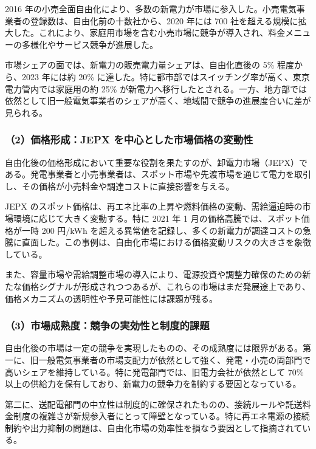 2016 年の小売全面自由化により、多数の新電力が市場に参入した。小売電気事業者の登録数は、自由化前の十数社から、2020 年には 700 社を超える規模に拡大した\parencite{METI2020RetailData}。これにより、家庭用市場を含む小売市場に競争が導入され、料金メニューの多様化やサービス競争が進展した。

市場シェアの面では、新電力の販売電力量シェアは、自由化直後の 5\% 程度から、2023 年には約 20\% に達した。特に都市部ではスイッチング率が高く、東京電力管内では家庭用の約 25\% が新電力へ移行したとされる。一方、地方部では依然として旧一般電気事業者のシェアが高く、地域間で競争の進展度合いに差が見られる。

\subsubsection{（2）価格形成：JEPX を中心とした市場価格の変動性}

自由化後の価格形成において重要な役割を果たすのが、卸電力市場（JEPX）である。発電事業者と小売事業者は、スポット市場や先渡市場を通じて電力を取引し、その価格が小売料金や調達コストに直接影響を与える。

JEPX のスポット価格は、再エネ比率の上昇や燃料価格の変動、需給逼迫時の市場環境に応じて大きく変動する。特に 2021 年 1 月の価格高騰では、スポット価格が一時 200 円/kWh を超える異常値を記録し、多くの新電力が調達コストの急騰に直面した\parencite{JEPX2021PriceSpike}。この事例は、自由化市場における価格変動リスクの大きさを象徴している。

また、容量市場や需給調整市場の導入により、電源投資や調整力確保のための新たな価格シグナルが形成されつつあるが、これらの市場はまだ発展途上であり、価格メカニズムの透明性や予見可能性には課題が残る。

\subsubsection{（3）市場成熟度：競争の実効性と制度的課題}

自由化後の市場は一定の競争を実現したものの、その成熟度には限界がある。第一に、旧一般電気事業者の市場支配力が依然として強く、発電・小売の両部門で高いシェアを維持している。特に発電部門では、旧電力会社が依然として 70\% 以上の供給力を保有しており、新電力の競争力を制約する要因となっている\parencite{OCCTO2022Supply}。

第二に、送配電部門の中立性は制度的に確保されたものの、接続ルールや託送料金制度の複雑さが新規参入者にとって障壁となっている。特に再エネ電源の接続制約や出力抑制の問題は、自由化市場の効率性を損なう要因として指摘されている。

